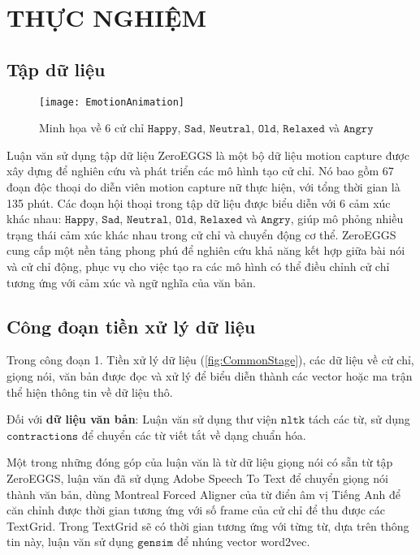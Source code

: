 \chapter{THỰC NGHIỆM}
\label{Chapter4}

\section{Tập dữ liệu}

\begin{figure}[H]
	\centering
	\texttt{[image: EmotionAnimation]}
	\caption{Minh họa về 6 cử chỉ $\texttt{Happy}$, $\texttt{Sad}$, $\texttt{Neutral}$, $\texttt{Old}$, $\texttt{Relaxed}$ và $\texttt{Angry}$}
\end{figure}

Luận văn sử dụng tập dữ liệu ZeroEGGS \cite{ghorbani2022zeroeggszeroshotexamplebasedgesture} là một bộ dữ liệu motion capture được xây dựng để nghiên cứu và phát triển các mô hình tạo cử chỉ. Nó bao gồm 67 đoạn độc thoại do diễn viên motion capture nữ thực hiện, với tổng thời gian là 135 phút. Các đoạn hội thoại trong tập dữ liệu được biểu diễn với 6 cảm xúc khác nhau: $\texttt{Happy}$, $\texttt{Sad}$, $\texttt{Neutral}$, $\texttt{Old}$, $\texttt{Relaxed}$ và $\texttt{Angry}$, giúp mô phỏng nhiều trạng thái cảm xúc khác nhau trong cử chỉ và chuyển động cơ thể. ZeroEGGS cung cấp một nền tảng phong phú để nghiên cứu khả năng kết hợp giữa bài nói và cử chỉ động, phục vụ cho việc tạo ra các mô hình có thể điều chỉnh cử chỉ tương ứng với cảm xúc và ngữ nghĩa của văn bản.

\section{Công đoạn tiền xử lý dữ liệu}
\label{sec:Preprocessing}

Trong công đoạn {1. Tiền xử lý dữ liệu} (\autoref{fig:CommonStage}), các dữ liệu về cử chỉ, giọng nói, văn bản được đọc và xử lý để biểu diễn thành các vector hoặc ma trận thể hiện thông tin về dữ liệu thô.

Đối với \textbf{dữ liệu văn bản}: Luận văn sử dụng thư viện $\texttt{nltk}$ tách các từ, sử dụng $\texttt{contractions}$ để chuyển các từ viết tắt về dạng chuẩn hóa.

Một trong những đóng góp của luận văn là từ dữ liệu giọng nói có sẵn từ tập ZeroEGGS, luận văn đã sử dụng Adobe Speech To Text để chuyển giọng nói thành văn bản, dùng Montreal Forced Aligner \cite{saxon2020robust} của từ điển âm vị Tiếng Anh để căn chỉnh được thời gian tương ứng với số frame của cử chỉ để thu được các TextGrid. Trong TextGrid sẽ có thời gian tương ứng với từng từ, dựa trên thông tin này, luận văn sử dụng  $\texttt{gensim}$ để nhúng vector word2vec.
 

